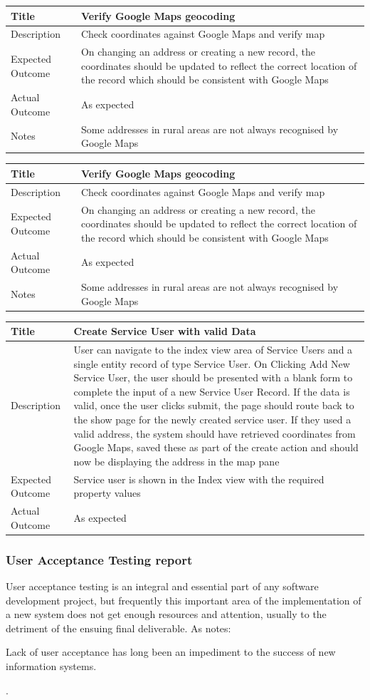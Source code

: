 \documentclass[a4paper,12pt]{article}
\newcommand\addrow[2]{#1 &#2\\ }
\newcommand\addheading[2]{#1 &#2\\ \hline}
\newcommand\tabularhead{\begin{tabular}{lp{11cm}}
\hline
}
\newenvironment{usecase}{\tabularhead}
{\hline\end{tabular}}
\begin{document}
\begin{usecase}
    \addheading{Title}{Verify Google Maps geocoding}
  \addheading{Description}{Check coordinates against Google Maps and verify map}
  \addrow{Expected Outcome}{ On changing an address or creating a new record, the coordinates should be updated to reflect the correct location of the record which should be consistent with Google Maps}
  \addrow{Actual Outcome}{As expected}
 \addrow{Notes}{Some addresses in rural areas are not always recognised by Google Maps}
\end{usecase}
 
\begin{usecase}
    \addheading{Title}{Verify Google Maps geocoding}
  \addheading{Description}{Check coordinates against Google Maps and verify map}
  \addrow{Expected Outcome}{ On changing an address or creating a new record, the coordinates should be updated to reflect the correct location of the record which should be consistent with Google Maps}
  \addrow{Actual Outcome}{As expected}
 \addrow{Notes}{Some addresses in rural areas are not always recognised by Google Maps}
\end{usecase}

\begin{usecase}
    \addheading{Title}{Create Service User with valid Data}
  \addheading{Description}{User can navigate to the index view area of Service Users and a single entity record of type Service User. On Clicking Add New Service User, the user should be presented with a blank form to complete the input of a new Service User Record. If the data is valid, once the user clicks submit, the page should route back to the show page for the newly created service user. If they used a valid address, the system should have retrieved coordinates from Google Maps, saved these as part of the create action and should now be displaying the address in the map pane}
  \addrow{Expected Outcome}{Service user is shown in the Index view with the required property values}
  \addrow{Actual Outcome}{As expected}
\end{usecase}


\subsubsection{User Acceptance Testing report}
User acceptance testing is an integral and essential part of any software development project, but frequently this important area of the implementation of a new system does not get enough resources and attention, usually to the detriment of the ensuing final deliverable. As \parencite{davis} notes:
\begin{displayquote}
Lack of user acceptance has long been an impediment to the success of new information systems.
\end{displayquote}.
\end{document}
